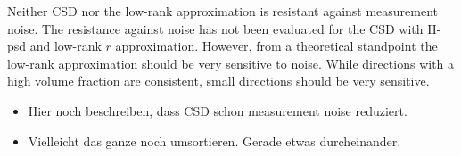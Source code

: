 Neither CSD nor the low-rank approximation is resistant against
measurement noise. The resistance against noise has not been evaluated for the
CSD with H-psd and low-rank $r$ approximation. However, from a theoretical
standpoint the low-rank approximation should be very sensitive to noise. While
directions with a high volume fraction are consistent, small directions should
be very sensitive.

\begin{itemize}
	\item Hier noch beschreiben, dass CSD schon measurement noise reduziert. 
	\item Vielleicht das ganze noch umsortieren. Gerade etwas durcheinander. 
\end{itemize}
